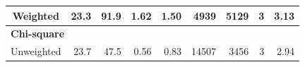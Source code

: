 {\begin{landscape}
\begin{table}[]
\begin{tabular}{crrrrrrrr}
Weighted                                                                                                   & 23.3                                                                                   & 91.9                                                                                        & 1.62                                                                            & 1.50                                                                                          & 4939                                                                                      & 5129                                                                                               & 3                                                                                       & 3.13                                                                                   \\ \hline
\multicolumn{9}{l}{\textbf{Chi-square}}                                                                                                                                                                                                                                                                                                                                                                                                                                                                                                                                                                                                                                                                                                                                                                                                                                 \\
Unweighted                                                                                                 & 23.7                                                                                   & 47.5                                                                                        & 0.56                                                                            & 0.83                                                                                          & 14507                                                                                     & 3456                                                                                               & 3                                                                                       & 2.94                                                                                   \\

\end{tabular}
\end{table}
\end{landscape}}
